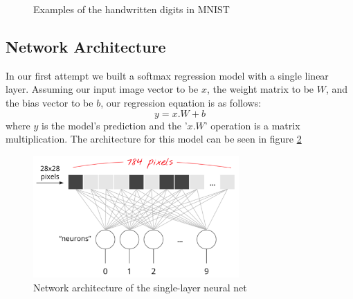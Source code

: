 \documentclass{article}
\begin{document}
\begin{figure}[h]
	\centering
    \quad
    \quad
    \quad
    \caption{Examples of the handwritten digits in MNIST}
    \label{fig:mnist}
\end{figure}

\subsection{Network Architecture}

In our first attempt we built a softmax regression model with a single linear layer. Assuming our input image vector to be $x$, the weight matrix to be $W$, and the bias vector to be $b$, our regression equation is as follows:
\[y = x.W + b\]
where $y$ is the model's prediction and the '$x.W$' operation is a matrix multiplication. The architecture for this model can be seen in figure \ref{fig:mnist-single-architecture}

\begin{figure}[h]
	\centering
	\includegraphics[width=0.7\textwidth]{mnist-single-architecture.png}
    \caption{Network architecture of the single-layer neural net}
    \label{fig:mnist-single-architecture}
\end{figure}
\end{document}
